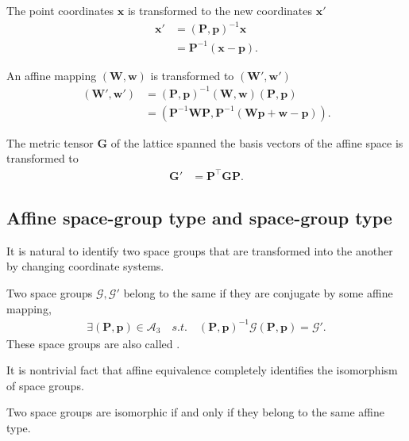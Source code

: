 The point coordinates $\bm{x}$ is transformed to the new coordinates $\bm{x}'$
\begin{align}
  \bm{x}'
  &= (\bm{P}, \bm{p})^{-1} \bm{x} \nonumber \\
  &= \bm{P}^{-1} ( \bm{x} - \bm{p} ).
\end{align}

An affine mapping $(\bm{W}, \bm{w})$ is transformed to $(\bm{W}', \bm{w}')$
\begin{align}
  (\bm{W}', \bm{w}')
  &= (\bm{P}, \bm{p})^{-1} (\bm{W}, \bm{w}) (\bm{P}, \bm{p}) \nonumber \\
  &= \left( \bm{P}^{-1} \bm{W} \bm{P}, \bm{P}^{-1}(\bm{Wp} + \bm{w} - \bm{p}) \right).
\end{align}

The metric tensor $\bm{G}$ of the lattice spanned the basis vectors of the affine space is transformed to
\begin{align}
  \bm{G}' &= \bm{P}^{\top} \bm{GP}.
\end{align}

\subsection{\label{sec:space-group-type}Affine space-group type and space-group type}

It is natural to identify two space groups that are transformed into the another by changing coordinate systems.

\begin{screen}
  \begin{definition}
    Two space groups $\mathcal{G}, \mathcal{G}'$ belong to the same  if they are conjugate by some affine mapping,
    \begin{align}
      \exists (\bm{P}, \bm{p}) \in \mathcal{A}_{3} \quad s.t. \quad (\bm{P}, \bm{p})^{-1} \mathcal{G} (\bm{P}, \bm{p}) = \mathcal{G}'.
    \end{align}
    These space groups are also called .
  \end{definition}
\end{screen}

It is nontrivial fact that affine equivalence completely identifies the isomorphism of space groups.

\begin{screen}
  \begin{theorem}[Bieberbach]
    Two space groups are isomorphic if and only if they belong to the same affine type.
  \end{theorem}
\end{screen}


